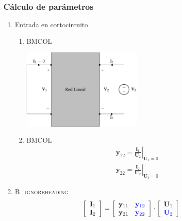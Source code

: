 \subsubsection{Cálculo de parámetros}
\label{sec:org7676724}

\begin{enumerate}
\item Entrada en cortocircuito
\label{sec:org1d8c65d}

\begin{enumerate}
\item \hfill{}\textsc{BMCOL}
\label{sec:orgda9e197}

\includegraphics[height=4cm]{../figs/parametrosY_salida.pdf}


\item \hfill{}\textsc{BMCOL}
\label{sec:org35720cd}
\renewcommand{\arraystretch}{2}
\[
  \begin{array}{c}
    \mathbf{y}_{12} = \left.\frac{\mathbf{I}_1}{\mathbf{U}_2}\right\rvert_{\mathbf{U}_1 = 0}\\
    \mathbf{y}_{22} = \left.\frac{\mathbf{I}_2}{\mathbf{U}_2}\right\rvert_{\mathbf{U}_1 = 0}
  \end{array}
\]
\end{enumerate}

\item \hfill{}\textsc{B\_ignoreheading}
\label{sec:org5814116}
\[
  \left[
    \begin{array}{c}
      \mathbf{I}_1\\
      \mathbf{I}_2
    \end{array}
  \right] =
  \left[
    \begin{array}{cc}
      \mathbf{y}_{11} & \color{blue}{\mathbf{y}_{12}}\\
      \mathbf{y}_{21} & \color{blue}{\mathbf{y}_{22}}
    \end{array}
  \right] \cdot
  \left[
    \begin{array}{c}
      \mathbf{U}_1\\
      \color{blue}{\mathbf{U}_2}
    \end{array}
  \right]
\]
\end{enumerate}

